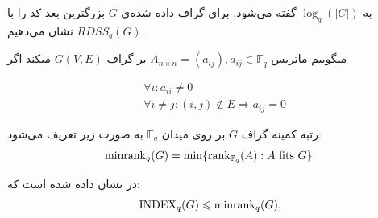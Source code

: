 به
$\log_q(|C|)$
 گفته می‌شود. برای گراف داده شده‌ی $G$ بزرگترین بعد کد را با
 $RDSS_q(G)$
 نشان می‌دهیم.
  \begin{definition}
  	میگوییم ماتریس
  	$A_{n \times n} = (a_{ij}), a_{ij} \in \mathbb{F}_q$
  	بر گراف
  	$G(V, E)$
  	میکند اگر 
  	\begin{latin}
  		\begin{align*}
  			& \forall i : a_{ii} \ne 0 \\
  			& \forall i \ne j:  (i, j) \notin E \Rightarrow a_{ij} = 0
  		\end{align*}
  	\end{latin}
  \end{definition}
 \begin{definition}
 	رتبه کمینه گراف
 	$G$
 	بر روی میدان
 	$\mathbb{F}_q$
 	به صورت زیر تعریف می‌شود:
 	\begin{equation}
 		\mathrm{minrank}_q(G) = \min\{\operatorname{rank}_{\mathbb{F}_q}(A): A \text{ fits } G\}.
 	\end{equation}
 \end{definition}
 \begin{theorem}
 	در
 	\cite{4031356}
 	نشان داده شده است که:
 	\begin{equation}
 		\mathrm{INDEX}_q(G) \leqslant \mathrm{minrank}_q(G),
 		\label{eq:bary}
 	\end{equation} 
 \end{theorem}
